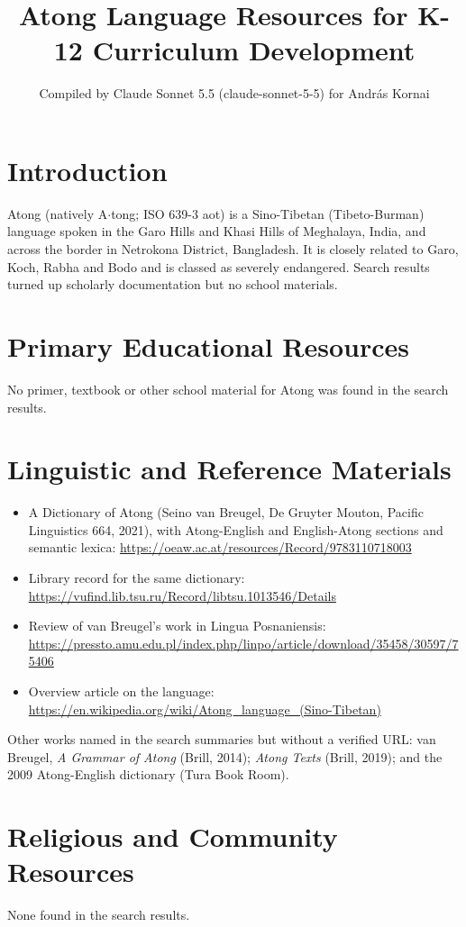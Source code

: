 \documentclass[12pt]{article}
\title{Atong Language Resources for K-12 Curriculum Development}
\author{Compiled by Claude Sonnet 5.5 (claude-sonnet-5-5) for Andr\'as Kornai}
\date{}
\begin{document}
\maketitle

\section{Introduction}
Atong (natively A$\cdot$tong; ISO 639-3 aot) is a Sino-Tibetan (Tibeto-Burman) language spoken in the Garo Hills and Khasi Hills of Meghalaya, India, and across the border in Netrokona District, Bangladesh. It is closely related to Garo, Koch, Rabha and Bodo and is classed as severely endangered. Search results turned up scholarly documentation but no school materials.

\section{Primary Educational Resources}
No primer, textbook or other school material for Atong was found in the search results.

\section{Linguistic and Reference Materials}
\begin{itemize}
\item A Dictionary of Atong (Seino van Breugel, De Gruyter Mouton, Pacific Linguistics 664, 2021), with Atong-English and English-Atong sections and semantic lexica: \url{https://oeaw.ac.at/resources/Record/9783110718003}
\item Library record for the same dictionary: \url{https://vufind.lib.tsu.ru/Record/libtsu.1013546/Details}
\item Review of van Breugel's work in Lingua Posnaniensis: \url{https://pressto.amu.edu.pl/index.php/linpo/article/download/35458/30597/75406}
\item Overview article on the language: \url{https://en.wikipedia.org/wiki/Atong_language_(Sino-Tibetan)}
\end{itemize}
Other works named in the search summaries but without a verified URL: van Breugel, \emph{A Grammar of Atong} (Brill, 2014); \emph{Atong Texts} (Brill, 2019); and the 2009 Atong-English dictionary (Tura Book Room).

\section{Religious and Community Resources}
None found in the search results.
\end{document}
